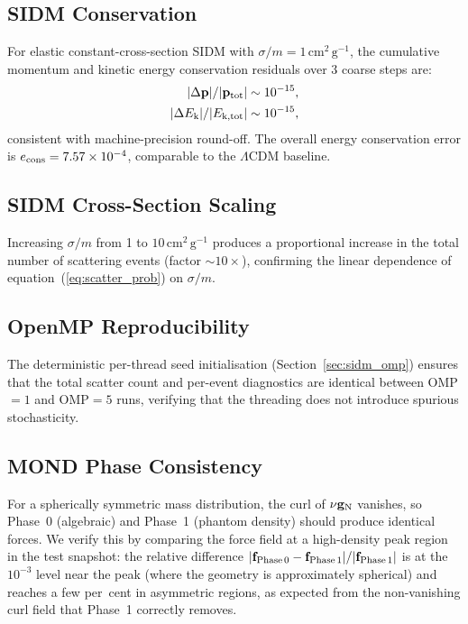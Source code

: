 \documentclass[fleqn,usenatbib]{mnras}
\newcommand{\sigmam}{\sigma/m}
\newcommand{\gN}{\mathbf{g}_{\rm N}}
\begin{document}
\subsection{SIDM Conservation}
\label{sec:verify_sidm}

For elastic constant-cross-section SIDM with
$\sigmam = 1\,\mathrm{cm^2\,g^{-1}}$, the cumulative momentum and
kinetic energy conservation residuals over 3 coarse steps are:
\begin{align}
|\Delta \mathbf{p}| / |\mathbf{p}_{\rm tot}| &\sim 10^{-15}, \\
|\Delta E_{\rm k}| / |E_{\rm k,tot}| &\sim 10^{-15},
\end{align}
consistent with machine-precision round-off.  The overall energy
conservation error is $e_{\rm cons} = 7.57\times10^{-4}$, comparable
to the $\Lambda$CDM baseline.

\subsection{SIDM Cross-Section Scaling}
\label{sec:verify_scaling}

Increasing $\sigmam$ from 1 to $10\,\mathrm{cm^2\,g^{-1}}$ produces
a proportional increase in the total number of scattering events
(factor ${\sim}10\times$), confirming the linear dependence of
equation~(\ref{eq:scatter_prob}) on $\sigmam$.

\subsection{OpenMP Reproducibility}
\label{sec:verify_omp}

The deterministic per-thread seed initialisation
(Section~\ref{sec:sidm_omp}) ensures that the total scatter count and
per-event diagnostics are identical between OMP${}=1$ and OMP${}=5$
runs, verifying that the threading does not introduce spurious
stochasticity.

\subsection{MOND Phase Consistency}
\label{sec:verify_mond}

For a spherically symmetric mass distribution, the curl of
$\nu\gN$ vanishes, so Phase~0 (algebraic) and Phase~1 (phantom
density) should produce identical forces.  We verify this by
comparing the force field at a high-density peak region in the
test snapshot: the relative difference $|\mathbf{f}_{\rm Phase\,0} -
\mathbf{f}_{\rm Phase\,1}|/|\mathbf{f}_{\rm Phase\,1}|$ is at the
$10^{-3}$ level near the peak (where the geometry is approximately
spherical) and reaches a few per~cent in asymmetric regions, as
expected from the non-vanishing curl field that Phase~1 correctly
removes.
\end{document}
